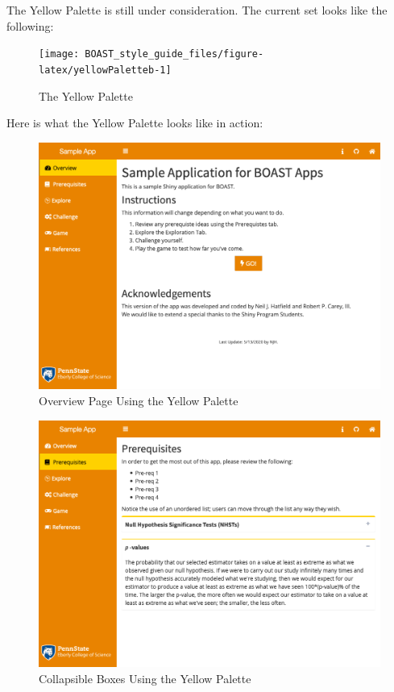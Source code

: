 \documentclass[
]{book}
\begin{document}
The Yellow Palette is still under consideration. The current set looks like the following:

\begin{figure}

{\centering \texttt{[image: BOAST\_style\_guide\_files/figure-latex/yellowPaletteb-1]} 

}

\caption{The Yellow Palette}\label{fig:yellowPaletteb}
\end{figure}

Here is what the Yellow Palette looks like in action:

\begin{figure}

{\centering \includegraphics[width=14in]{images/colorThemes/yellowOverview} 

}

\caption{Overview Page Using the Yellow Palette}\label{fig:yellowAction1b}
\end{figure}

\begin{figure}

{\centering \includegraphics[width=14in]{images/colorThemes/yellowCollapse} 

}

\caption{Collapsible Boxes Using the Yellow Palette}\label{fig:yellowAction2b}
\end{figure}
\end{document}
